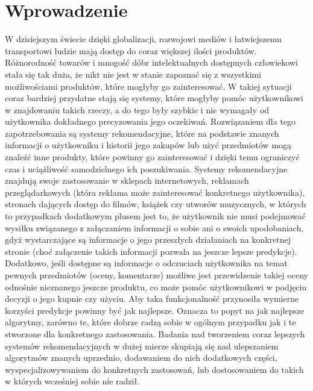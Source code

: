 \documentclass{pracamgr}
\begin{document}
 \chapter*{Wprowadzenie}
  W dzisiejszym świecie dzięki globalizacji, rozwojowi mediów i łatwiejszemu transportowi ludzie mają dostęp do coraz większej ilości produktów. 
  Różnorodność towarów i mnogość dóbr intelektualnych dostępnych człowiekowi stała się tak duża, że nikt nie jest w stanie zapoznać się z wszystkimi
  możliwościami produktów, które mogłyby go zainteresować. W takiej sytuacji coraz bardziej przydatne stają się systemy, które mogłyby pomóc użytkownikowi
  w znajdowaniu takich rzeczy, a do tego były szybkie i nie wymagały od użytkownika dokładnego precyzowania jego oczekiwań.
  Rozwiązaniem dla tego zapotrzebowania są systemy rekomendacyjne, które na podstawie znanych informacji o użytkowniku
  i historii jego zakupów lub użyć przedmiotów mogą znaleźć inne produkty, które powinny go zainteresować i dzięki temu ograniczyć czas i uciążliwość
  samodzielnego ich poszukiwania.\newline
  Systemy rekomendacyjne znajdują swoje zastosowanie w sklepach internetowych, reklamach przeglądarkowych
  (która reklama może zainteresować konkretnego użytkownika), stronach dających dostęp do filmów, książek czy utworów muzycznych,
  w których to przypadkach dodatkowym plusem jest to, że użytkownik nie musi podejmować wysiłku związanego z załączaniem informacji o sobie ani
  o swoich upodobaniach, gdyż wystarczające są informacje o jego przeszłych działaniach na konkretnej stronie
  (choć załączenie takich informacji pozwala na jeszcze lepsze predykcje). Dodatkowo, jeśli dostępne są informacje o odczuciach użytkownika
  na temat pewnych przedmiotów (oceny, komentarze) możliwe jest przewidzenie takiej oceny odnośnie nieznanego jeszcze produktu, co może pomóc użytkownikowi
  w podjęciu decyzji o jego kupnie czy użyciu.\newline
  Aby taka funkcjonalność przynosiła wymierne korzyści predykcje powinny być jak najlepsze. Oznacza to popyt na jak najlepsze algorytmy,
  zarówno te, które dobrze radzą sobie w ogólnym przypadku jak i te stworzone dla konkretnego zastosowania.\newline
  Badania nad tworzeniem coraz lepszych systemów rekomendacyjnych w dużej mierze skupiają się nad ulepszaniem algorytmów znanych
  uprzednio, dodawaniem do nich dodatkowych części, wyspecjalizowywaniem do konkretnych zastosowań,
  lub dostosowaniem do takich w których wcześniej sobie nie radził.\newline
  
\end{document}
